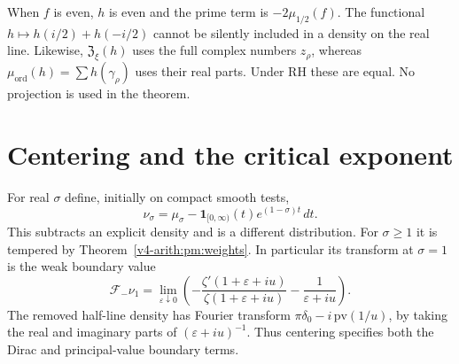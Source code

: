 When $f$ is even, $h$ is even and the prime term is
$-2\mu_{1/2}(f)$. The functional
$h\mapsto h(i/2)+h(-i/2)$ cannot be silently included in a density
on the real line. Likewise, $\mathfrak Z_\xi(h)$ uses the full
complex numbers $z_\rho$, whereas
$\mu_{\mathrm{ord}}(h)=\sum h(\gamma_\rho)$ uses their real parts.
Under RH these are equal. No projection is used in the theorem.

\section{Centering and the critical exponent}
\label{v4-arith:pm:centered-section}

For real $\sigma$ define, initially on compact smooth tests,
\[
 \nu_\sigma=\mu_\sigma
       -\mathbf1_{[0,\infty)}(t)e^{(1-\sigma)t}\,dt.
\]
This subtracts an explicit density and is a different distribution.
For $\sigma\geq1$ it is tempered by
Theorem~\ref{v4-arith:pm:weights}. In particular its transform at
$\sigma=1$ is the weak boundary value
\[
 \mathcal F_-\nu_1
 =\lim_{\varepsilon\downarrow0}
    \left(-\frac{\zeta'(1+\varepsilon+iu)}
                 {\zeta(1+\varepsilon+iu)}
                    -\frac1{\varepsilon+iu}\right).
\]
The removed half-line density has Fourier transform
$\pi\delta_0-i\,\mathrm{pv}(1/u)$, by taking the real and imaginary
parts of $(\varepsilon+iu)^{-1}$. Thus centering specifies both the
Dirac and principal-value boundary terms.

